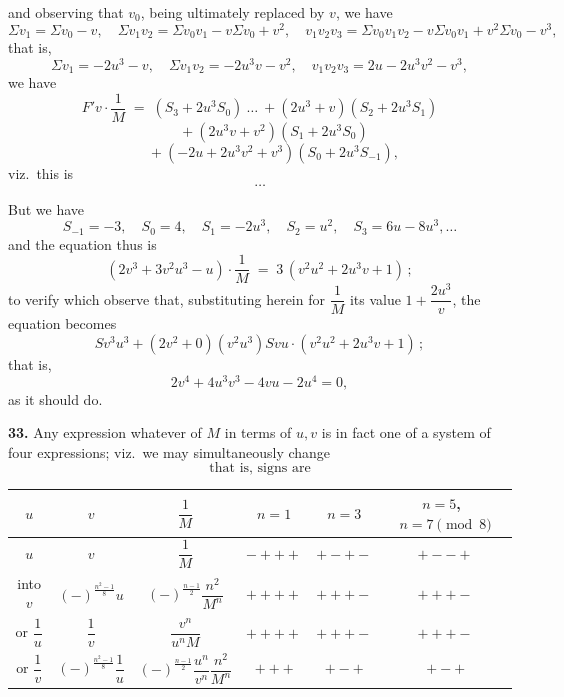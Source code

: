 \documentclass[11pt]{article}
\begin{document}
and observing that $v_0$, being ultimately replaced by $v$, we have
\[
\Sigma v_1 = \Sigma v_0 - v,\quad
\Sigma v_1 v_2 = \Sigma v_0 v_1 - v\Sigma v_0 + v^2,\quad
v_1 v_2 v_3 = \Sigma v_0 v_1 v_2 - v\Sigma v_0 v_1 + v^2\Sigma v_0 - v^3,
\]
that is,
\[
\Sigma v_1 = -2u^3 - v,\quad
\Sigma v_1 v_2 = -2u^3 v - v^2,\quad
v_1 v_2 v_3 = 2u - 2u^3 v^2 - v^3,
\]
we have
\[
F'v\cdot\frac{1}{M} \;=\; (S_3 + 2u^3 S_0)\ \ldots\ + (2u^3 + v)(S_2 + 2u^3 S_1)
\]
\[
\qquad + (2u^3 v + v^2)(S_1 + 2u^3 S_0)
\]
\[
\qquad + (-2u + 2u^3 v^2 + v^3)(S_0 + 2u^3 S_{-1}),
\]
viz.\ this is
\[
\ldots
\]

But we have
\[
S_{-1} = -3,\quad S_0 = 4,\quad S_1 = -2u^3,\quad S_2 = u^2,\quad S_3 = 6u - 8u^3,\ldots
\]
and the equation thus is
\[
(2v^3 + 3v^2 u^3 - u)\cdot\frac{1}{M} \;=\; 3\,(v^2 u^2 + 2u^3 v + 1)\,;
\]
to verify which observe that, substituting herein for $\dfrac{1}{M}$ its
value $1 + \dfrac{2u^3}{v}$, the equation becomes
\[
S v^3 u^3 + (2v^2 + 0)(v^2 u^3) S v u\cdot (v^2 u^2 + 2u^3 v + 1) \,;
\]
that is,
\[
2v^4 + 4u^3 v^3 - 4 v u - 2u^4 = 0,
\]
as it should do.

\medskip
\textbf{33.} Any expression whatever of $M$ in terms of $u, v$ is in fact
one of a system of four expressions; viz.\ we may simultaneously change
\[
\text{that is, signs are}
\]
\begin{center}
\begin{tabular}{c|c|cccc}
$u$ & $v$ & $\dfrac{1}{M}$ & $n=1$ & $n=3$ & $n=5$,\ $n=7\pmod 8$ \\[2pt]
\hline
$u$ & $v$ & $\dfrac{1}{M}$ & $-+++$ & $+-+-$ & $+--+$ \\[2pt]
into $v$ & $(-)^{\frac{n^2-1}{8}}u$ & $(-)^{\frac{n-1}{2}}\dfrac{n^2}{M^n}$ & $++++$ & $+++-$ & $+++-$ \\[2pt]
or $\dfrac{1}{u}$ & $\dfrac{1}{v}$ & $\dfrac{v^n}{u^n M}$ & $++++$ & $+++-$ & $+++-$ \\[2pt]
or $\dfrac{1}{v}$ & $(-)^{\frac{n^2-1}{8}}\dfrac{1}{u}$ & $(-)^{\frac{n-1}{2}}\dfrac{u^n}{v^n}\dfrac{n^2}{M^n}$ & $+++$ & $+-+$ & $+-+$ \\
\end{tabular}
\end{center}
\end{document}

